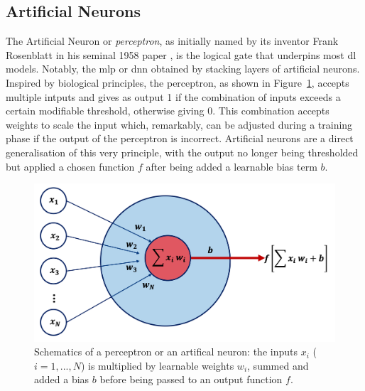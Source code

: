 \subsection{Artificial Neurons}
The Artificial Neuron or \textit{perceptron}, as initially named by its inventor Frank Rosenblatt in his seminal 1958 paper \cite{rosenblatt1958perceptron}, is the logical gate that underpins most \gls{dl} models. Notably, the \gls{mlp} or \gls{dnn} obtained by stacking layers of artificial neurons. Inspired by biological principles, the perceptron, as shown in Figure~\ref{fig:annModel}, accepts multiple intputs and gives as output 1 if the combination of inputs exceeds a certain modifiable threshold, otherwise giving 0. This combination accepts weights to scale the input which, remarkably, can be adjusted during a training phase if the output of the perceptron is incorrect. Artificial neurons are a direct generalisation of this very principle, with the output no longer being thresholded but applied a chosen function $f$ after being added a learnable bias term $b$. 

\begin{figure}[h!]
    \center
    \includegraphics[scale=0.4]{Images/ML/ann.png}
    \caption{Schematics of a perceptron or an artifical neuron: the inputs $x_i$ ($i= 1, ..., N$) is multiplied by learnable weights $w_i$, summed and added a bias $b$ before being passed to an output function $f$.} 
    \label{fig:annModel}
\end{figure}

